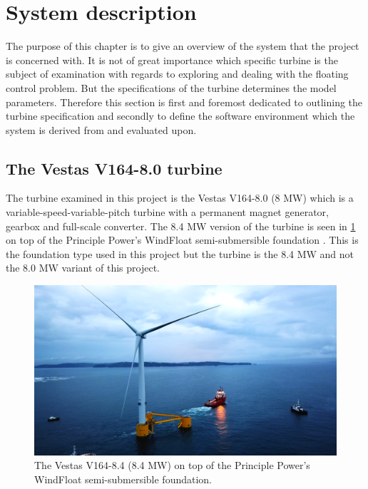 \section{System description} \label{sec:sys-descr}
The purpose of this chapter is to give an overview of the system that the project is concerned with. It is not of great importance which specific turbine is the subject of examination with regards to exploring and dealing with the floating control problem. But the specifications of the turbine determines the model parameters. Therefore this section is first and foremost dedicated to outlining the turbine specification and secondly to define the software environment which the system is derived from and evaluated upon. 

\subsection{The Vestas V164-8.0 turbine}
The turbine examined in this project is the Vestas V164-8.0 (8 MW) which is a variable-speed-variable-pitch turbine with a permanent magnet generator, gearbox and full-scale converter. The 8.4 MW version of the turbine is seen in \cref{fig:v164_8.4mw} on top of the Principle Power’s WindFloat semi-submersible foundation \cite{WindFloatAtlantic}. This is the foundation type used in this project but the turbine is the 8.4 MW and not the 8.0 MW variant of this project.


\begin{figure}[ht]
	\centering
	\includegraphics[width=0.70\linewidth]{Graphics/v164-8_4mw_floating.png}
	\caption{The Vestas V164-8.4 (8.4 MW) on top of the Principle Power’s WindFloat semi-submersible foundation.}
	\label{fig:v164_8.4mw}
\end{figure}

